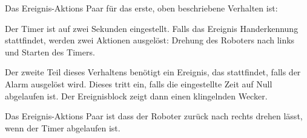Das Ereignis-Aktions Paar für das erste, oben beschriebene Verhalten ist: 

Der Timer ist auf zwei Sekunden eingestellt. Falls das Ereignis Handerkennung stattfindet, werden zwei Aktionen ausgelöst: Drehung des Roboters nach links und Starten des Timers.

Der zweite Teil dieses Verhaltens benötigt ein Ereignis, das stattfindet, falls der Alarm ausgelöst wird. Dieses tritt ein, falls die eingestellte Zeit auf Null abgelaufen ist. Der Ereignisblock  zeigt dann einen klingelnden Wecker.

Das Ereignis-Aktions Paar ist
dass der Roboter zurück nach rechts drehen lässt, wenn der Timer abgelaufen ist.



